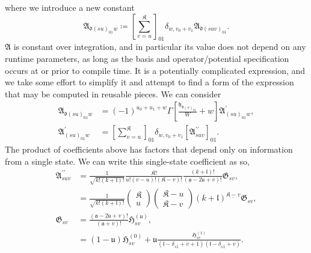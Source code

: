 where we introduce a new constant
\begin{equation}
\mathfrak{A}_{\mathfrak{d}\left(su\right)_{01}w}
    \coloneqq
        \left[ \sum_{v=u}^{\mathfrak{K}} \right]_{01}
        \delta_{w,v_{0}+v_{1}}\mathfrak{A}_{\mathfrak{d}\left(suv\right)_{01}}
.
\end{equation}
$\mathfrak{A}$ is constant over integration, and in particular its value does not
depend on any runtime parameters, as long as the basis and operator/potential
specification occurs at or prior to compile time. It is a potentially
complicated expression, and we take some effort to simplify it and attempt to
find a form of the expression that may be computed in reusable pieces. We can
consider 
\begin{align}
\mathfrak{A}_{\mathfrak{d}\left(su\right)_{01}w}
    &=
        \left(-1\right)^{u_{0}+u_{1}+w}
        \Gamma\left[
            \frac{\mathfrak{h}_{\mathfrak{d}\left(s\right)_{01}}}{W}+w
        \right]
        \mathfrak{A}_{\left(su\right)_{01}w}^{\prime}
\label{appendix:elements:precalc-coeffs-0}
,\\
\mathfrak{A}_{\left(su\right)_{01}w}^{\prime}
    &=
        \left[\sum_{v=u}^{\mathfrak{K}}\right]_{01}
        \delta_{w,v_{0}+v_{1}}
        \left[\mathfrak{A}_{suv}^{\prime\prime}\right]_{01}
.
\end{align}
The product of coefficients above has factors that depend only on information
from a single state. We can write this single-state coefficient as so,
\begin{align}
\mathfrak{A}_{suv}^{\prime\prime}
    &=
        \frac{1}{\sqrt{k!\left(k+\mathfrak{l}\right)!}}
        \frac{\mathfrak{K}!}{u!\left(v-u\right)!\left(\mathfrak{K}-v\right)!}
        \frac
        {\left(k+\mathfrak{l}\right)!}
        {\left(\mathfrak{a}-2\mathfrak{u}+v\right)!}
        \mathfrak{G}_{sv}
,\\
    &=
        \frac{1}{\sqrt{k!\left(k+\mathfrak{l}\right)!}}
        \begin{pmatrix}\mathfrak{K}\\u\end{pmatrix}
        \begin{pmatrix}\mathfrak{K}-u\\\mathfrak{K}-v\end{pmatrix}
        \left(k+\mathfrak{l}\right)^{\underline{\mathfrak{K}-v}}
        \mathfrak{G}_{sv}
,\\
\mathfrak{G}_{sv}
    &=
        \frac
        {\left(\mathfrak{a}-2\mathfrak{u} + v\right)!}
        {\left(\mathfrak{a}+ v\right)!}
        \mathfrak{H}_{sv}^{\left(\mathfrak{u}\right)}
,\\
    &=
        \left(1-\mathfrak{u}\right)\mathfrak{H}_{sv}^{\left(0\right)}
            +
        \mathfrak{u}
        \frac
        { \mathfrak{H}_{sv}^{\left(1\right)} }
        {
            \left(\mathfrak{l}-\delta_{s\bar{1}}+v+1\right)
            \left(\mathfrak{l}-\delta_{s\bar{1}}+v\right) }
.
\end{align}
